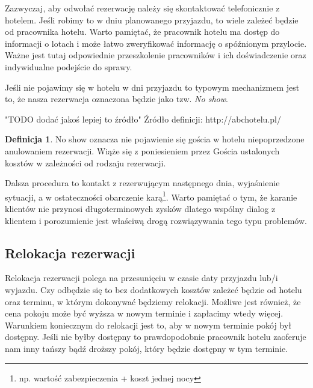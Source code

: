 \documentclass[a4paper,onecolumn,oneside,11pt,wide,floatssmall]{mwrep}
\theoremstyle{definition}
\newtheorem{defn}{Definicja}[section]
\theoremstyle{plain}%
\theoremstyle{remark}
\begin{document}
Zazwyczaj, aby odwołać rezerwację należy się skontaktować telefonicznie z 
hotelem. Jeśli robimy to w dniu planowanego przyjazdu, to wiele 
zależeć będzie od pracownika hotelu. Warto pamiętać, że pracownik hotelu ma 
dostęp do informacji o lotach i może łatwo zweryfikować informację o 
spóźnionym przylocie. Ważne jest tutaj odpowiednie przeszkolenie pracowników 
i ich doświadczenie oraz indywidualne podejście do sprawy.

Jeśli nie pojawimy się w hotelu w dni przyjazdu to typowym mechanizmem jest 
to, że nasza rezerwacja oznaczona będzie jako tzw. \emph{No show}. 

"TODO dodać jakoś lepiej to źródło"
Źródło definicji: http://abchotelu.pl/
\begin{defn}{No show}
oznacza nie pojawienie się gościa w hotelu niepoprzedzone anulowaniem rezerwacji. 
Wiąże się z poniesieniem przez Gościa ustalonych kosztów w zależności od 
rodzaju rezerwacji. 
\end{defn}

Dalsza procedura to kontakt z rezerwującym następnego dnia, wyjaśnienie 
sytuacji, a w ostateczności obarczenie karą\footnote{np. wartość zabezpieczenia 
+ koszt jednej nocy}. Warto pamiętać o tym, że karanie klientów nie przynosi 
długoterminowych zysków dlatego wspólny dialog z klientem i porozumienie 
jest właściwą drogą rozwiązywania tego typu problemów.

\subsection{Relokacja rezerwacji}
Relokacja rezerwacji polega na przesunięciu w czasie daty przyjazdu lub/i 
wyjazdu. Czy odbędzie się to bez dodatkowych kosztów zależeć będzie od 
hotelu oraz terminu, w którym dokonywać będziemy relokacji. Możliwe jest 
również, że cena pokoju może być wyższa w nowym terminie i zapłacimy wtedy 
więcej. Warunkiem koniecznym do relokacji jest to, aby w nowym terminie 
pokój był dostępny. Jeśli nie byłby dostępny to prawdopodobnie pracownik 
hotelu zaoferuje nam inny tańszy bądź droższy pokój, który będzie dostępny w 
tym terminie.
\end{document}
